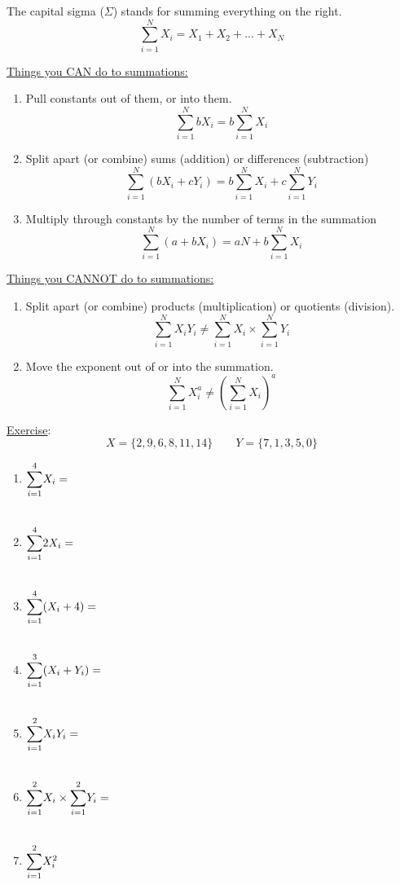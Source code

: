 \documentclass{./../handout}
\begin{document}
\thispagestyle{plain}
\begin{center}
\end{center}	

The capital sigma ($\Sigma$) stands for summing everything on the right. 
$$ \sum_{i=1}^N X_i = X_1 + X_2 + ... + X_N $$

\underline{Things you CAN do to summations:}
\begin{enumerate}
\item Pull constants out of them, or into them.
$$ \sum_{i=1}^N b X_i = b \sum_{i=1}^N X_i  $$
\item Split apart (or combine) sums (addition) or differences (subtraction)
$$ \sum_{i=1}^N (b X_i + c Y_i) = b \sum_{i=1}^N X_i  + c \sum_{i=1}^N Y_i $$
\item Multiply through constants by the number of terms in the summation
$$ \sum_{i=1}^N (a+b X_i)= aN + b \sum_{i=1}^N X_i  $$
\end{enumerate}

\underline{Things you CANNOT do to summations:}
\begin{enumerate}
\item Split apart (or combine) products (multiplication) or quotients (division).
$$ \sum_{i=1}^N X_i Y_i \neq  \sum_{i=1}^N X_i \times \sum_{i=1}^N Y_i   $$
\item Move the exponent out of or into the summation.
$$ \sum_{i=1}^N X_i^a \neq  \left(\sum_{i=1}^N X_i\right)^a $$
\end{enumerate}

\underline{Exercise}:
$$ X = \{2,9,6,8,11,14\} \quad \quad Y = \{7,1,3,5,0\}$$ 
\begin{enumerate}
\item $\mathlarger{\sum}_{i=1}^4 X_i = $ \\~\\
\item $\mathlarger{\sum}_{i=1}^4 2 X_i = $ \\~\\
\item $\mathlarger{\sum}_{i=1}^4 (X_i+4) = $ \\~\\
\item $\mathlarger{\sum}_{i=1}^3 (X_i+Y_i) = $ \\~\\
\item $\mathlarger{\sum}_{i=1}^2 X_i Y_i = $ \\~\\
\item $\mathlarger{\sum}_{i=1}^2 X_i \times \mathlarger{\sum}_{i=1}^2 Y_i = $ \\~\\
\item $\mathlarger{\sum}_{i=1}^2 X_i^2 $ \\~\\
\end{enumerate}
\end{document}
